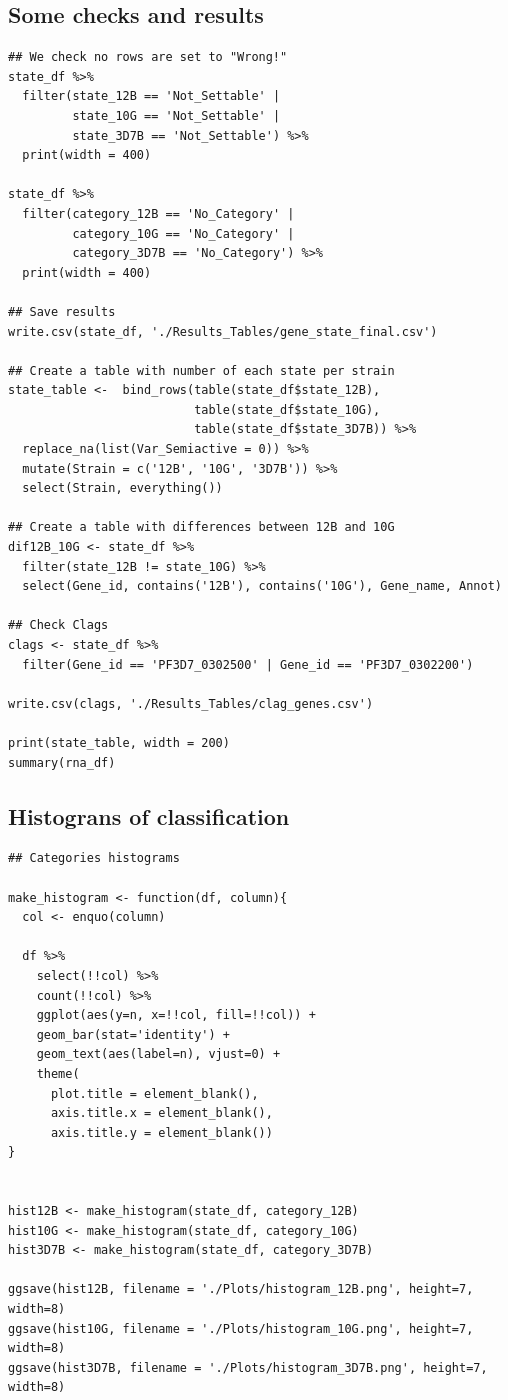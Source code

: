 \documentclass[11pt]{article}
\begin{document}
\subsection{Some checks and results}
\label{sec:org3b0629c}
\begin{verbatim}
## We check no rows are set to "Wrong!"
state_df %>%
  filter(state_12B == 'Not_Settable' |
         state_10G == 'Not_Settable' |
         state_3D7B == 'Not_Settable') %>%
  print(width = 400)

state_df %>%
  filter(category_12B == 'No_Category' |
         category_10G == 'No_Category' |
         category_3D7B == 'No_Category') %>%
  print(width = 400)

## Save results
write.csv(state_df, './Results_Tables/gene_state_final.csv')

## Create a table with number of each state per strain
state_table <-  bind_rows(table(state_df$state_12B),
                          table(state_df$state_10G),
                          table(state_df$state_3D7B)) %>%
  replace_na(list(Var_Semiactive = 0)) %>%
  mutate(Strain = c('12B', '10G', '3D7B')) %>%
  select(Strain, everything())

## Create a table with differences between 12B and 10G
dif12B_10G <- state_df %>%
  filter(state_12B != state_10G) %>%
  select(Gene_id, contains('12B'), contains('10G'), Gene_name, Annot)

## Check Clags
clags <- state_df %>%
  filter(Gene_id == 'PF3D7_0302500' | Gene_id == 'PF3D7_0302200')

write.csv(clags, './Results_Tables/clag_genes.csv')

print(state_table, width = 200)
summary(rna_df)
\end{verbatim}
\subsection{Histograns of classification}
\label{sec:org3ba05cf}
\begin{verbatim}
## Categories histograms

make_histogram <- function(df, column){
  col <- enquo(column)

  df %>%
    select(!!col) %>%
    count(!!col) %>%
    ggplot(aes(y=n, x=!!col, fill=!!col)) +
    geom_bar(stat='identity') +
    geom_text(aes(label=n), vjust=0) +
    theme(
      plot.title = element_blank(),
      axis.title.x = element_blank(),
      axis.title.y = element_blank())
}


hist12B <- make_histogram(state_df, category_12B)
hist10G <- make_histogram(state_df, category_10G)
hist3D7B <- make_histogram(state_df, category_3D7B)

ggsave(hist12B, filename = './Plots/histogram_12B.png', height=7, width=8)
ggsave(hist10G, filename = './Plots/histogram_10G.png', height=7, width=8)
ggsave(hist3D7B, filename = './Plots/histogram_3D7B.png', height=7, width=8)
\end{verbatim}
\end{document}
